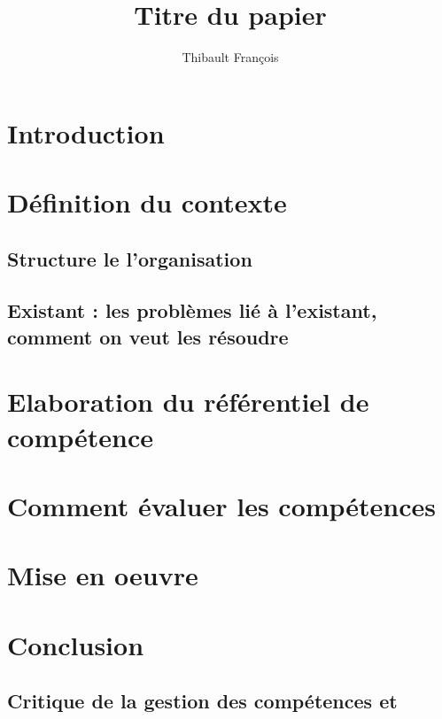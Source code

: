 \documentclass[a4paper,10pt]{report}
\begin{document}
\title  {Titre du papier}
\author  {Thibault François }
\maketitle
\tableofcontents  %

\chapter{Introduction}
\chapter{Définition du contexte}
\section{Structure le l'organisation}
\section{Existant : les problèmes lié à l'existant, comment on veut les résoudre}

\chapter{Elaboration du référentiel de compétence}
\chapter{Comment évaluer les compétences}
\chapter{Mise en oeuvre}
\chapter{Conclusion}
\section{Critique de la gestion des compétences et }







\label{Bibliographie}
\lhead{\nouppercase{\leftmark}}
 
\end{document}
